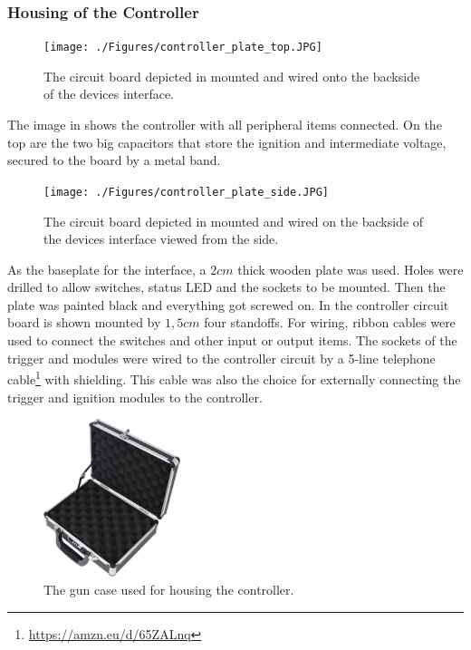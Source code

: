 \pagebreak

\subsubsection{Housing of the Controller}
\label{Housing of the Controller}

\begin{figure}[!ht]
    \centering
    \texttt{[image: ./Figures/controller\_plate\_top.JPG]}
    \caption{ The circuit board depicted in  mounted and wired onto the backside of the devices interface. }
    \label{fig:controller_plate_top}     
\end{figure}

\noindent The image in  shows the controller with all peripheral items connected. On the top are the two big capacitors that store the ignition and intermediate voltage, secured to the board by a metal band.\\

\begin{figure}[!ht]
    \centering
    \texttt{[image: ./Figures/controller\_plate\_side.JPG]}
    \caption{ The circuit board depicted in  mounted and wired on the backside of the devices interface viewed from the side. }
    \label{fig:controller_plate_side}     
\end{figure}

\noindent As the baseplate for the interface, a $2cm$ thick wooden plate was used. Holes were drilled to allow switches, status LED and the sockets to be mounted. Then the plate was painted black and everything got screwed on. In  the controller circuit board is shown mounted by $1,5cm$ four standoffs. For wiring, ribbon cables were used to connect the switches and other input or output items. The sockets of the trigger and modules were wired to the controller circuit by a 5-line telephone cable\footnote{\url{https://amzn.eu/d/65ZALnq}} with shielding. This cable was also the choice for externally connecting the trigger and ignition modules to the controller.   

\pagebreak

\begin{figure}[!ht]
    \centering
    \includegraphics[width=4cm]{./Figures/gn_case.jpg}
    \caption{ The gun case used for housing the controller. }
    \label{fig:gn_case}     
\end{figure}

